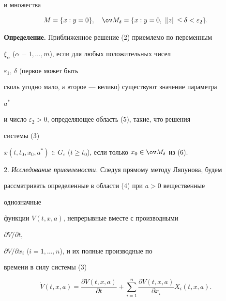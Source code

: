 и множества 


\begin{equation} 


M=\{x:y=0\},\quad \ov M_\delta=\{x:y=0,\ \|z\|\le 


\delta<\varepsilon_2\}.


\end{equation}


 


{\bf Определение.} Приближенное решение (2) приемлемо по переменным  


$\xi_\alpha$ ($\alpha=1,\dotsc,m$), если для любых положительных чисел 


$\varepsilon_1$, $\delta$ (первое может быть  


сколь угодно мало, а второе --- велико) существуют значение параметра 


$a^*$ 


и число $\varepsilon_2>0$, определяющее область (5), такие, что решения 


системы (3)  


$x(t,t_0,x_0,a^*)\in G_\varepsilon$ ($t\ge t_0$), если только $x_0\in\ov 


M_\delta$ из (6). 


\medskip 


 


2. {\it Исследование приемлемости.} Следуя прямому методу Ляпунова, будем  


рассматривать определенные в области (4) при $a>0$ вещественные 


однозначные  


функции $V(t,x,a)$, непрерывные вместе с производными 


$\partial V/\partial t$, 


$\partial V/\partial x_i$ ($i=1,\dotsc,n$), и их полные производные по 


времени в силу системы (3) 


\begin{equation} 


\Dot V(t,x,a)=\frac{\partial V(t,x,a)}{\partial t}+ 


\sum^n_{i=1}\frac{\partial V(t,x,a)}{\partial x_i} 


X_i(t,x,a). 


\end{equation} 


 


